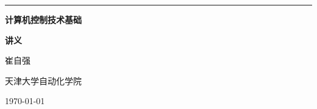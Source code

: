 \thispagestyle{empty}

\begin{center}

{\rule{\textwidth}{1pt}}

  \vspace{12em}

  {\Huge \textbf{计算机控制技术基础}}

  \vspace{3em}
  {\Huge \textbf{讲义}}

  \vspace{3em}
  {\Large{崔自强}}

  \vspace{1em}
  {\Large{天津大学自动化学院}}






  \vspace{24em}


  {\Large\today}


\end{center}
